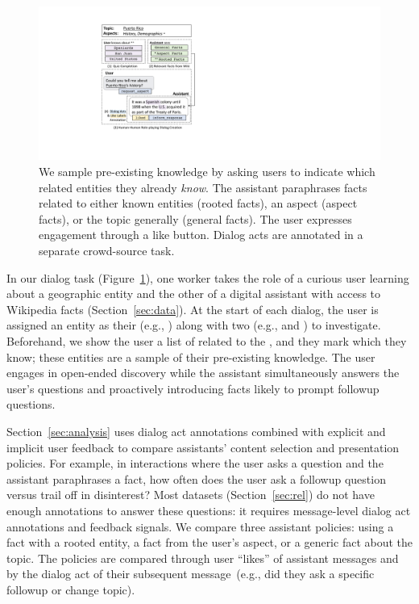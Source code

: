 \begin{figure}[t]
    \centering
    \includegraphics[width=\linewidth]{2020_emnlp_curiosity/figures/rover-dialog}
    \vspace{-16pt}
    \caption{
        We sample pre-existing knowledge by asking users to indicate which  related entities they already \emph{know}.
        The assistant paraphrases facts related to either known entities (rooted facts), an aspect (aspect facts), or the topic generally (general facts).
        The user expresses engagement through a like button.
        Dialog acts are annotated in a separate crowd-source task.
    }
    \vspace{-16pt}
    \label{fig:ex-dia}
\end{figure}

In our dialog task (Figure~\ref{fig:ex-dia}), one worker takes the role of a curious user learning about a geographic entity and the other of a digital assistant with access to Wikipedia facts (Section~\ref{sec:data}).
At the start of each dialog, the user is assigned an entity as their  (e.g., ) along with two  (e.g.,  and ) to investigate.
Beforehand, we show the user a list of  related to the , and they mark which they know; these entities are a sample of their pre-existing knowledge.
The user engages in open-ended discovery while the assistant simultaneously answers the user's questions and proactively introducing facts likely to prompt followup questions.

Section~\ref{sec:analysis} uses dialog act annotations combined with explicit and implicit user feedback to compare assistants' content selection and presentation policies.
For example, in interactions where the user asks a question and the assistant paraphrases a fact, how often does the user ask a followup question versus trail off in disinterest?
Most datasets (Section~\ref{sec:rel}) do not have enough annotations to answer these questions: it requires message-level dialog act annotations and feedback signals.
We compare three assistant policies: using a fact with a rooted entity, a fact from the user's aspect, or a generic fact about the topic.
The policies are compared through user ``likes'' of assistant messages and by the dialog act of their subsequent message~(e.g., did they ask a specific followup or change topic).

